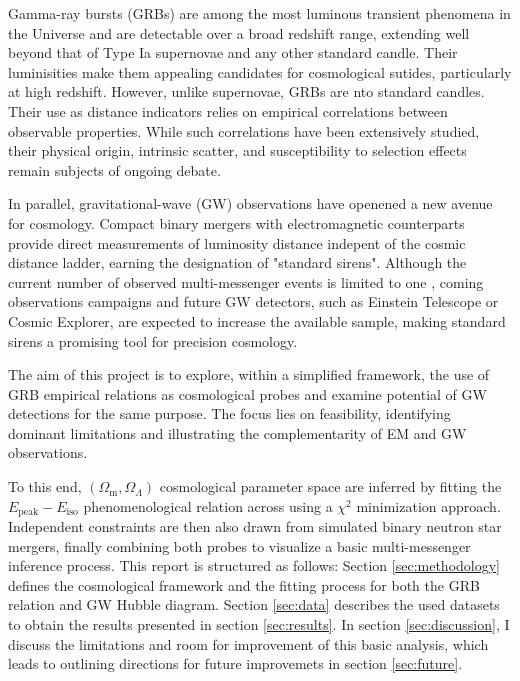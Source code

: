 \documentclass[
    aps,
    prd,
    twocolumn,
    nofootinbib,
    floatfix,
    superscriptaddress
]{revtex4-2}
\newcommand{\Om}{\Omega_{\mathrm{m}}}
\newcommand{\Ol}{\Omega_\Lambda}
\newcommand{\Ep}{E_\mathrm{peak}}
\newcommand{\Ei}{E_\mathrm{iso}}
\begin{document}
Gamma-ray bursts (GRBs) are among the most luminous transient phenomena in the Universe and are detectable over a broad redshift range, extending well beyond that of Type Ia supernovae and any other standard candle. Their luminisities make them appealing candidates for cosmological sutides, particularly at high redshift. However, unlike supernovae, GRBs are nto standard candles. Their use as distance indicators relies on empirical correlations between observable properties. %
While such correlations have been extensively studied, their physical origin, intrinsic scatter, and susceptibility to selection effects remain subjects of ongoing debate.

In parallel, gravitational-wave (GW) observations have openened a new avenue for cosmology. Compact binary mergers with electromagnetic counterparts provide direct measurements of luminosity distance indepent of the cosmic distance ladder, earning the designation of "standard sirens". Although the current number of observed multi-messenger events is limited to one \cite{PhysRevLett.119.161101}, coming observations campaigns \cite{Salafia_2025} and future GW detectors, such as Einstein Telescope or Cosmic Explorer, are expected to increase the available sample, making standard sirens a promising tool for precision cosmology.

The aim of this project is to explore, within a simplified framework, the use of GRB empirical relations as cosmological probes and examine potential of GW detections for the same purpose. The focus lies on feasibility, identifying dominant limitations and illustrating the complementarity of EM and GW observations.

To this end, $(\Om, \Ol)$ cosmological parameter space are inferred by fitting the $\Ep-\Ei$ phenomenological relation across using a $\chi^2$ minimization approach. Independent constraints are then also drawn from simulated binary neutron star mergers, finally combining both probes to visualize a basic multi-messenger inference process. This report is structured as follows: Section \ref{sec:methodology} defines the cosmological framework and the fitting process for both the GRB relation and GW Hubble diagram. Section \ref{sec:data} describes the used datasets to obtain the results presented in section \ref{sec:results}. In section \ref{sec:discussion}, I discuss the limitations and room for improvement of this basic analysis, which leads to outlining directions for future improvemets in section \ref{sec:future}.
\end{document}
